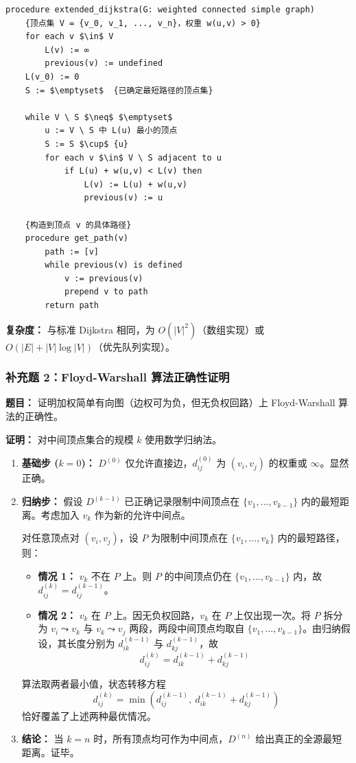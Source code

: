 \documentclass[11pt,UTF8]{article}
\begin{document}
\begin{verbatim}
procedure extended_dijkstra(G: weighted connected simple graph)
    {顶点集 V = {v_0, v_1, ..., v_n}，权重 w(u,v) > 0}
    for each v $\in$ V
        L(v) := ∞
        previous(v) := undefined
    L(v_0) := 0
    S := $\emptyset$  {已确定最短路径的顶点集}
    
    while V \ S $\neq$ $\emptyset$
        u := V \ S 中 L(u) 最小的顶点
        S := S $\cup$ {u}
        for each v $\in$ V \ S adjacent to u
            if L(u) + w(u,v) < L(v) then
                L(v) := L(u) + w(u,v)
                previous(v) := u
    
    {构造到顶点 v 的具体路径}
    procedure get_path(v)
        path := [v]
        while previous(v) is defined
            v := previous(v)
            prepend v to path
        return path
\end{verbatim}

\textbf{复杂度：} 与标准 Dijkstra 相同，为 $O(|V|^2)$（数组实现）或 $O(|E| + |V|\log|V|)$（优先队列实现）。

\subsubsection*{补充题 2：Floyd-Warshall 算法正确性证明}
\textbf{题目：} 证明加权简单有向图（边权可为负，但无负权回路）上 Floyd-Warshall 算法的正确性。

\textbf{证明：} 对中间顶点集合的规模 $k$ 使用数学归纳法。

\begin{enumerate}[1.]
    \item \textbf{基础步 ($k=0$)：} $D^{(0)}$ 仅允许直接边，$d_{ij}^{(0)}$ 为 $(v_i,v_j)$ 的权重或 $\infty$。显然正确。
    
    \item \textbf{归纳步：} 假设 $D^{(k-1)}$ 已正确记录限制中间顶点在 $\{v_1,\dots,v_{k-1}\}$ 内的最短距离。考虑加入 $v_k$ 作为新的允许中间点。
    
    对任意顶点对 $(v_i,v_j)$，设 $P$ 为限制中间顶点在 $\{v_1,\dots,v_k\}$ 内的最短路径，则：
    \begin{itemize}
        \item \textbf{情况 1：} $v_k$ 不在 $P$ 上。则 $P$ 的中间顶点仍在 $\{v_1,\dots,v_{k-1}\}$ 内，故 $d_{ij}^{(k)} = d_{ij}^{(k-1)}$。
        \item \textbf{情况 2：} $v_k$ 在 $P$ 上。因无负权回路，$v_k$ 在 $P$ 上仅出现一次。将 $P$ 拆分为 $v_i \leadsto v_k$ 与 $v_k \leadsto v_j$ 两段，两段中间顶点均取自 $\{v_1,\dots,v_{k-1}\}$。由归纳假设，其长度分别为 $d_{ik}^{(k-1)}$ 与 $d_{kj}^{(k-1)}$，故
        \[ d_{ij}^{(k)} = d_{ik}^{(k-1)} + d_{kj}^{(k-1)} \]
    \end{itemize}
    算法取两者最小值，状态转移方程
    \[ d_{ij}^{(k)} = \min\!\left(d_{ij}^{(k-1)},\ d_{ik}^{(k-1)} + d_{kj}^{(k-1)}\right) \]
    恰好覆盖了上述两种最优情况。
    
    \item \textbf{结论：} 当 $k=n$ 时，所有顶点均可作为中间点，$D^{(n)}$ 给出真正的全源最短距离。证毕。
\end{enumerate}
\end{document}
